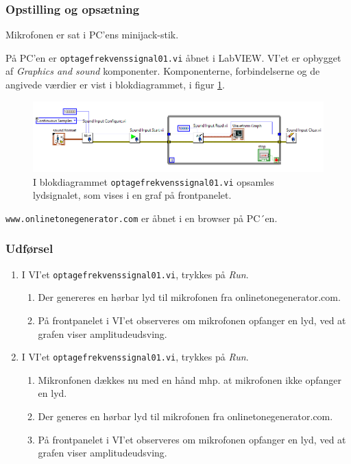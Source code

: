 		\subsubsection{Opstilling og opsætning}
		Mikrofonen er sat i PC'ens minijack-stik. 
	  
			På PC'en er \texttt{optagefrekvenssignal01.vi} åbnet i LabVIEW. VI'et er opbygget af \textit{Graphics and sound} komponenter. Komponenterne, forbindelserne og de angivede værdier er vist i blokdiagrammet, i figur \ref{fig:bdoptage}.   \\   
	
			\begin{figure}[htb]
			\centering
				\includegraphics[width=5in]{of01.PNG}
				\caption{I blokdiagrammet \texttt{optagefrekvenssignal01.vi} opsamles lydsignalet, som vises i en graf på frontpanelet.}	
				\label{fig:bdoptage}
			\end{figure}	  
			
			\texttt{www.onlinetonegenerator.com} er åbnet i en browser på PC´en. 
	
		\subsubsection{Udførsel}
			\begin{enumerate}
				\item I VI'et \texttt{optagefrekvenssignal01.vi}, trykkes på \textit{Run}.  
				\begin{enumerate}
				\item Der genereres en hørbar lyd til mikrofonen fra onlinetonegenerator.com. 
				\item På frontpanelet i VI'et observeres om mikrofonen opfanger en lyd, ved at grafen viser amplitudeudsving.
				\end{enumerate}
				\item I VI'et \texttt{optagefrekvenssignal01.vi}, trykkes på \textit{Run}. 
				\begin{enumerate}
				\item Mikronfonen dækkes nu med en hånd mhp. at mikrofonen ikke opfanger en lyd. 
				\item Der generes en hørbar lyd til mikrofonen fra onlinetonegenerator.com. 
				\item På frontpanelet i VI'et observeres om mikrofonen opfanger en lyd, ved at grafen viser amplitudeudsving.
				\end{enumerate}
			\end{enumerate}
			
